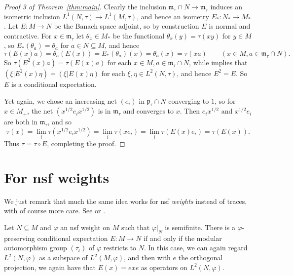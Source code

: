 \documentclass[a4paper,11pt]{article}
\newcommand{\mf}[1]{{\mathfrak{#1}}}
\theoremstyle{definition}
\begin{document}
\begin{proof}[{Proof 3 of Theorem~\ref{thm:main}}]
Clearly the inclusion $\mf m_\tau \cap N \to \mf m_\tau$ induces an isometric inclusion $L^1(N,\tau) \to L^1(M,\tau)$, and hence an isometry $E_* \colon N_* \to M_*$.  Let $E \colon M \to N$ be the Banach space adjoint, so by construction $E$ is normal and contractive.  For $x\in \mf m_\tau$ let $\theta_x \in M_*$ be the functional $\theta_x(y) = \tau(xy)$ for $y\in M$, so $E_*(\theta_a) = \theta_a$ for $a\in N\subseteq M$, and hence
\[ \tau(E(x)a) = \theta_a(E(x)) = E_*(\theta_a)(x) = \theta_a(x) = \tau(xa)
\qquad (x\in M, a\in\mf m_\tau\cap N). \]
So $\tau(E^2(x)a) = \tau(E(x)a)$ for each $x\in M, a\in\mf m_\tau\cap N$, while implies that $(\xi|E^2(x)\eta) = (\xi|E(x)\eta)$ for each $\xi,\eta\in L^2(N,\tau)$, and hence $E^2=E$.  So $E$ is a conditional expectation.  

Yet again, we chose an increasing net $(e_i)$ in $\mf p_\tau \cap N$ converging to $1$, so for $x\in M_+$, the net $(x^{1/2}e_ix^{1/2})$ is in $\mf m_\tau$ and converges to $x$.  Then $e_i x^{1/2}$ and $x^{1/2}e_i$ are both in $\mf m_\tau$, and so
\[ \tau(x) = \lim_i \tau(x^{1/2}e_ix^{1/2}) = \lim_i \tau(xe_i)
= \lim_i \tau(E(x)e_i)
= \tau(E(x)). \]
Thus $\tau = \tau\circ E$, completing the proof.
\end{proof}



\section{For nsf weights}

We just remark that much the same idea works for nsf \emph{weights} instead of traces, with of course more care.  See \cite[Theorem~III.4.7.7]{Blackadar_OperatorAlgebrasBook} or \cite[Chapter~, Theorem~4.2]{TakesakiII}.

Let $N\subseteq M$ and $\varphi$ an nsf weight on $M$ such that $\varphi|_N$ is semifinite.  There is a $\varphi$-preserving conditional expectation $E\colon M \to N$ if and only if the modular automorphism group $(\tau_t)$ of $\varphi$ restricts to $N$.  In this case, we can again regard $L^2(N,\varphi)$ as a subspace of $L^2(M,\varphi)$, and then with $e$ the orthogonal projection, we again have that $E(x) = exe$ as operators on $L^2(N, \varphi)$.



%
%

\end{document}
